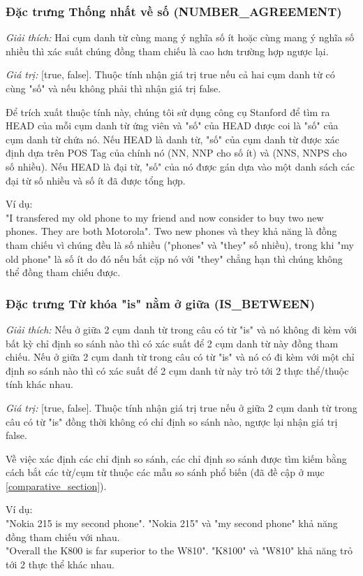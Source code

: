 \documentclass[12pt]{report}
\begin{document}
				\subsubsection*{Đặc trưng Thống nhất về số (NUMBER\_AGREEMENT)}
					\par \textit{Giải thích:} Hai cụm danh từ cùng mang ý nghĩa số ít hoặc cùng mang ý nghĩa số nhiều thì xác suất chúng đồng tham chiếu là cao hơn trường hợp ngược lại. 
					\par \textit{Giá trị:} [true, false]. Thuộc tính nhận giá trị true nếu cả hai cụm danh từ có cùng "số" và nếu không phải thì nhận giá trị false.
					\par Để trích xuất thuộc tính này, chúng tôi sử dụng công cụ Stanford để tìm ra HEAD của mỗi cụm danh từ ứng viên và "số" của HEAD được coi là "số" của cụm danh từ chứa nó. Nếu HEAD là danh từ, "số" của cụm danh từ được xác định dựa trên POS Tag của chính nó (NN, NNP cho số ít) và (NNS, NNPS cho số nhiều). Nếu HEAD là đại từ, "số" của nó được gán dựa vào một danh sách các đại từ số nhiều và số ít đã được tổng hợp.
					\par Ví dụ:
					\\"I transfered my old phone to my friend and now consider to buy two new phones. They are both Motorola". Two new phones và they khả năng là đồng tham chiếu vì chúng đều là số nhiều ("phones" và "they" số nhiều), trong khi "my old phone" là số ít do đó nếu bắt cặp nó với "they" chẳng hạn thì chúng không thể đồng tham chiếu được.				

				\subsubsection*{Đặc trưng Từ khóa "is" nằm ở giữa (IS\_BETWEEN)}
					\par \textit{Giải thích:} Nếu ở giữa 2 cụm danh từ trong câu có từ "is" và nó không đi kèm với bất kỳ chỉ định so sánh nào thì có xác suất để 2 cụm danh từ này đồng tham chiếu. Nếu ở giữa 2 cụm danh từ trong câu có từ "is" và nó có đi kèm với một chỉ định so sánh nào thì có xác suất để 2 cụm danh từ này trỏ tới 2 thực thể/thuộc tính khác nhau.
					\par \textit{Giá trị:} [true, false]. Thuộc tính nhận giá trị true nếu ở giữa 2 cụm danh từ trong câu có từ "is" đồng thời không có chỉ định so sánh nào, ngược lại nhận giá trị false.
					\par Về việc xác định các chỉ định so sánh, các chỉ định so sánh được tìm kiếm bằng cách bắt các từ/cụm từ thuộc các mẫu so sánh phổ biến (đã đề cập ở mục \ref{comparative_section}).
					\par Ví dụ: 
					\\"Nokia 215 is my second phone". "Nokia 215" và "my second phone" khả năng đồng tham chiếu với nhau.
					\\"Overall the K800 is far superior to the W810". "K8100" và "W810" khả năng trỏ tới 2 thực thể khác nhau.
\end{document}
